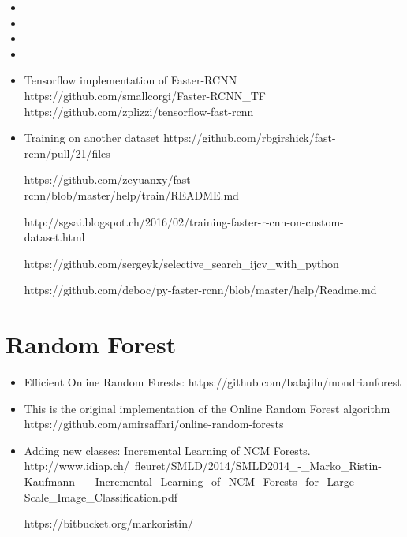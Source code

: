 \documentclass{article}
\begin{document}
\begin{itemize}

\item {}

\item {}

\item {}

\item {}

\item Tensorflow implementation of Faster-RCNN \newline
https://github.com/smallcorgi/Faster-RCNN\_TF \newline
https://github.com/zplizzi/tensorflow-fast-rcnn

\item Training on another dataset \newline
https://github.com/rbgirshick/fast-rcnn/pull/21/files

https://github.com/zeyuanxy/fast-rcnn/blob/master/help/train/README.md

http://sgsai.blogspot.ch/2016/02/training-faster-r-cnn-on-custom-dataset.html

https://github.com/sergeyk/selective\_search\_ijcv\_with\_python

https://github.com/deboc/py-faster-rcnn/blob/master/help/Readme.md

\end{itemize}


\section{Random Forest}

\begin{itemize}

\item  Efficient Online Random Forests: \newline
 https://github.com/balajiln/mondrianforest

\item This is the original implementation of the Online Random Forest algorithm \newline
https://github.com/amirsaffari/online-random-forests

\item Adding new classes: \newline
Incremental Learning of NCM Forests. \newline
http://www.idiap.ch/~fleuret/SMLD/2014/SMLD2014\_-\_Marko\_Ristin-Kaufmann\_-\_Incremental\_Learning\_of\_NCM\_Forests\_for\_Large-Scale\_Image\_Classification.pdf

https://bitbucket.org/markoristin/
\end{itemize}
\end{document}
